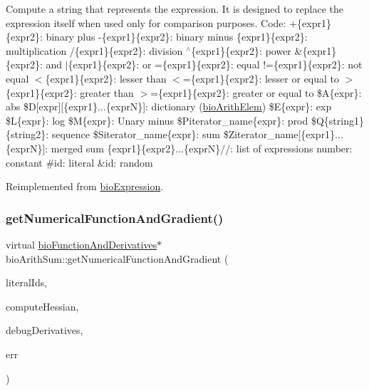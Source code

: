 Compute a string that represents the expression. It is designed to replace the expression itself when used only for comparison purposes. Code\+: +\{expr1\}\{expr2\}\+: binary plus -\/\{expr1\}\{expr2\}\+: binary minus \{expr1\}\{expr2\}\+: multiplication /\{expr1\}\{expr2\}\+: division $^\wedge$\{expr1\}\{expr2\}\+: power \&\{expr1\}\{expr2\}\+: and $\vert$\{expr1\}\{expr2\}\+: or =\{expr1\}\{expr2\}\+: equal !=\{expr1\}\{expr2\}\+: not equal $<$\{expr1\}\{expr2\}\+: lesser than $<$=\{expr1\}\{expr2\}\+: lesser or equal to $>$\{expr1\}\{expr2\}\+: greater than $>$=\{expr1\}\{expr2\}\+: greater or equal to \$A\{expr\}\+: abs \$D\mbox{[}expr\mbox{]}\mbox{[}\{expr1\}...\{exprN\}\mbox{]}\+: dictionary (\hyperlink{classbio_arith_elem}{bio\+Arith\+Elem}) \$E\{expr\}\+: exp \$L\{expr\}\+: log \$M\{expr\}\+: Unary minus \$\+Piterator\+\_\+name\{expr\}\+: prod \$Q\{string1\}\{string2\}\+: sequence \$\+Siterator\+\_\+name\{expr\}\+: sum \$\+Ziterator\+\_\+name\mbox{[}\{expr1\}...\{exprN\}\mbox{]}\+: merged sum \{expr1\}\{expr2\}...\{exprN\}//\+: list of expressions number\+: constant \#id\+: literal \&id\+: random 

Reimplemented from \hyperlink{classbio_expression_a3e4b4dca58dbbc6f0e411b30eb3f60b4}{bio\+Expression}.

\mbox{\label{classbio_arith_sum_afe9b54bab626e9dbe2b3aefebbcb6f8f}} 
\subsubsection{\texorpdfstring{get\+Numerical\+Function\+And\+Gradient()}{getNumericalFunctionAndGradient()}\hspace{0.1cm}{\footnotesize\ttfamily [1/4]}}
{\footnotesize\ttfamily virtual \hyperlink{classbio_function_and_derivatives}{bio\+Function\+And\+Derivatives}$\ast$ bio\+Arith\+Sum\+::get\+Numerical\+Function\+And\+Gradient (\begin{DoxyParamCaption}\item[{vector$<$ pat\+U\+Long $>$}]{literal\+Ids,  }\item[{pat\+Boolean}]{compute\+Hessian,  }\item[{pat\+Boolean}]{debug\+Derivatives,  }\item[{pat\+Error $\ast$\&}]{err }\end{DoxyParamCaption})\hspace{0.3cm}{\ttfamily [virtual]}}

